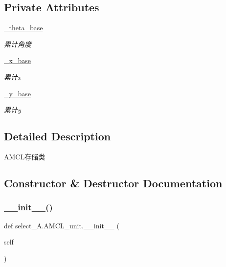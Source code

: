\subsection*{Private Attributes}
\begin{DoxyCompactItemize}
\item 
\hyperlink{classselect___a_1_1_a_m_c_l__unit_a787875feff286fd50a9ac334ac766647}{\+\_\+theta\+\_\+base}
\begin{DoxyCompactList}\small\item\em 累计角度 \end{DoxyCompactList}\item 
\hyperlink{classselect___a_1_1_a_m_c_l__unit_a6d3d2752981ff8cc08656d704f67a842}{\+\_\+x\+\_\+base}
\begin{DoxyCompactList}\small\item\em 累计x \end{DoxyCompactList}\item 
\hyperlink{classselect___a_1_1_a_m_c_l__unit_a8ff12ef2520e0a68a83b7b21ab0401a3}{\+\_\+y\+\_\+base}
\begin{DoxyCompactList}\small\item\em 累计y \end{DoxyCompactList}\end{DoxyCompactItemize}


\subsection{Detailed Description}
A\+M\+C\+L存储类 



\subsection{Constructor \& Destructor Documentation}
\mbox{\label{classselect___a_1_1_a_m_c_l__unit_a8900541517098e5491ed40c4d282beb8}} 
\subsubsection{\texorpdfstring{\+\_\+\+\_\+init\+\_\+\+\_\+()}{\_\_init\_\_()}}
{\footnotesize\ttfamily def select\+\_\+\+A.\+A\+M\+C\+L\+\_\+unit.\+\_\+\+\_\+init\+\_\+\+\_\+ (\begin{DoxyParamCaption}\item[{}]{self }\end{DoxyParamCaption})}



